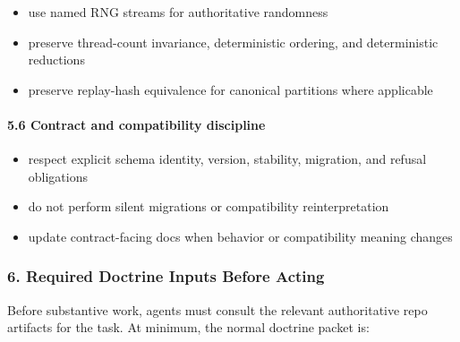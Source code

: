 \documentclass[9pt,a4paper,openany]{book}
\begin{document}
\begin{itemize}
\item use named RNG streams for authoritative randomness
\item preserve thread-\allowbreak{}count invariance, deterministic ordering, and deterministic reductions
\item preserve replay-\allowbreak{}hash equivalence for canonical partitions where applicable
\end{itemize}

\paragraph{5.6 Contract and compatibility discipline}

\begin{itemize}
\item respect explicit schema identity, version, stability, migration, and refusal obligations
\item do not perform silent migrations or compatibility reinterpretation
\item update contract-\allowbreak{}facing docs when behavior or compatibility meaning changes
\end{itemize}

\subsubsection{6. Required Doctrine Inputs Before Acting}

Before substantive work, agents must consult the relevant authoritative repo artifacts for the task.\allowbreak{} At minimum, the normal doctrine packet is:
\end{document}
